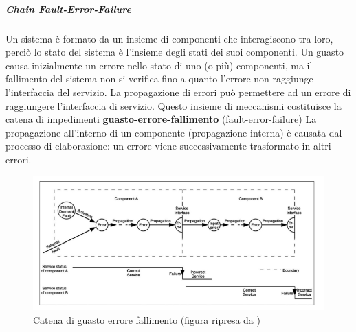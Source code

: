 \documentclass[14pt]{extarticle}
\begin{document}

\subparagraph{Chain Fault-Error-Failure}
Un sistema è formato da un insieme di componenti che interagiscono tra
loro, perciò lo stato del sistema è l'insieme degli stati dei suoi componenti. Un
guasto causa inizialmente un errore nello stato di uno (o più) componenti, ma
il fallimento del sistema non si verifica fino a quanto l'errore non raggiunge l'interfaccia del servizio. La propagazione di errori può permettere ad un errore
di raggiungere l'interfaccia di servizio. Questo insieme di meccanismi costituisce la catena di impedimenti \textbf{guasto-errore-fallimento} (fault-error-failure)
La propagazione all'interno di un componente (propagazione interna) è
causata dal processo di elaborazione: un errore viene successivamente trasformato in altri errori.
\begin{figure}
\centering
\includegraphics[scale=0.5]{catena_gef.png}
\caption{Catena di guasto errore fallimento (figura ripresa da \cite{avizienis2004basic})}
\label{fig:gef}
\end{figure}
\end{document}
